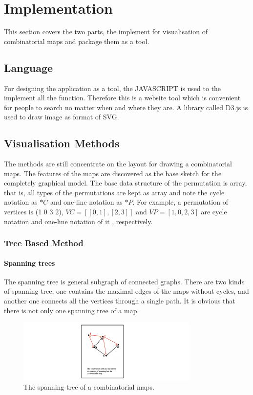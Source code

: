 
\chapter{Implementation}

This section covers the two parts, the implement for visualisation of combinatorial maps and package them as a tool.

\section{Language}

For designing the application as a tool, the JAVASCRIPT is used to the implement all the function. Therefore this  is a website tool which is convenient for people to search no matter when and where they are. A library called D3.js \cite{bostock2015d3} is used to draw image as format of SVG.

\section{Visualisation Methods}

The methods are still concentrate on the layout for drawing a combinatorial maps. The features of the maps are discovered as the base sketch for the completely graphical model. The base data structure of  the permutation is array, that is, all types of the permutations are kept as array and note the cycle notation as \(*C\) and one-line notation as \(*P\). For example, a permutation of vertices is (1 0 3 2), \(VC=[[0,1],[2,3]]\) and \(VP=[1,0,2,3]\) are cycle notation and one-line notation of it , respectively.

\subsection{Tree Based Method}

\subsubsection{Spanning trees}
The spanning tree is general subgraph of connected graphs. There are two kinds of spanning tree, one contains the maximal edges of the maps without cycles, and another one connects all the vertices through a single path. It is obvious that there is not only one spanning tree of a map.

\begin{figure}[htb]
    \centering
    \includegraphics[width=0.8\textwidth]{../../image/spanning tree.png}
    \caption{The spanning tree of a combinatorial maps.}
    \label{fig:figures:spantree}
  \end{figure}

